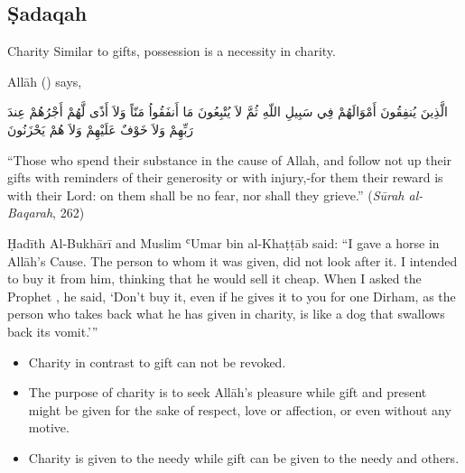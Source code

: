 \subsection{Ṣadaqah}

\begin{frame}{Charity \hfill {}}
Similar to gifts, possession is a necessity in charity.

Allāh ({}) says,\\[10pt]

\begin{Arabic}
الَّذِينَ يُنفِقُونَ أَمْوَالَهُمْ فِي سَبِيلِ اللّهِ ثُمَّ لاَ يُتْبِعُونَ مَا أَنفَقُواُ مَنّاً وَلاَ أَذًى لَّهُمْ أَجْرُهُمْ عِندَ رَبِّهِمْ وَلاَ خَوْفٌ عَلَيْهِمْ وَلاَ هُمْ يَحْزَنُونَ
\end{Arabic}

“Those who spend their substance in the cause of Allah, and follow not up their gifts with reminders of their generosity or with injury,-for them their reward is with their Lord: on them shall be no fear, nor shall they grieve.” (\textit{Sūrah al-Baqarah}, 262)
\end{frame}

\begin{frame}
\begin{block}{Ḥadīth \hfill Al-Bukhārī and Muslim}
ʿUmar bin al-Khaṭṭāb said:
“I gave a horse in Allāh's Cause. The person to whom it was given, did not look after it. I intended to buy it from him, thinking that he would sell it cheap. When I asked the Prophet \pbuh, he said, ‘Don't buy it, even if he gives it to you for one Dirham, as the person who takes back what he has given in charity, is like a dog that swallows back its vomit.’”
\end{block}
\end{frame}

\begin{frame}
\begin{itemize}
\item Charity in contrast to gift can not be revoked.
\item The purpose of charity is to seek Allāh’s pleasure while gift and present might be given for the sake of respect, love or affection, or even without any motive.
\item Charity is given to the needy while gift can be given to the needy and others.
\end{itemize}
\end{frame}

